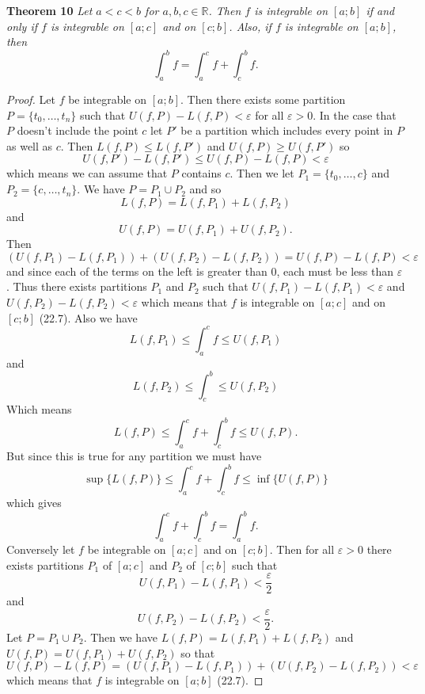 \documentclass{article}
\begin{document}
\begin{flushleft}
\textbf{Theorem 10}
\textsl{Let $a<c<b$ for $a,b,c \in \mathbb{R}$. Then $f$ is integrable on $[a;b]$ if and only if $f$ is integrable on $[a;c]$ and on $[c;b]$. Also, if $f$ is integrable on $[a;b]$, then
\[
\int_a^b f = \int_a^c f + \int_c^b f.
\]}
\begin{proof}
Let $f$ be integrable on $[a;b]$. Then there exists some partition $P = \{t_0, \dots , t_n\}$ such that $U(f,P)-L(f,P) < \varepsilon$ for all $\varepsilon > 0$. In the case that $P$ doesn't include the point $c$ let $P'$ be a partition which includes every point in $P$ as well as $c$. Then $L(f,P) \leq L(f,P')$ and $U(f,P) \geq U(f,P')$ so
\[
U(f,P')-L(f,P') \leq U(f,P) - L(f,P) < \varepsilon
\]
which means we can assume that $P$ contains $c$. Then we let $P_1 = \{t_0, \dots , c\}$ and $P_2 = \{c, \dots , t_n\}$. We have $P = P_1 \cup P_2$ and so
\[
L(f,P) = L(f,P_1) + L(f,P_2)
\]
and
\[
U(f,P) = U(f,P_1) + U(f,P_2).
\]
Then
\[
(U(f,P_1)-L(f,P_1)) + (U(f,P_2) - L(f,P_2)) = U(f,P) - L(f,P) < \varepsilon
\]
and since each of the terms on the left is greater than $0$, each must be less than $\varepsilon$. Thus there exists partitions $P_1$ and $P_2$ such that $U(f,P_1)-L(f,P_1) < \varepsilon$ and $U(f,P_2) - L(f,P_2) < \varepsilon$ which means that $f$ is integrable on $[a;c]$ and on $[c;b]$ (22.7). Also we have
\[
L(f,P_1) \leq \int_a^c f \leq U(f,P_1)
\]
and
\[
L(f,P_2) \leq \int_c^b \leq U(f,P_2)
\]
Which means
\[
L(f,P) \leq \int_a^c f + \int_c^b f \leq U(f,P).
\]
But since this is true for any partition we must have
\[
\sup \{L(f,P)\} \leq \int_a^c f + \int_c^b f \leq \inf \{U(f,P)\}
\]
which gives
\[
\int_a^c f + \int_c^b f = \int_a^b f.
\]
Conversely let $f$ be integrable on $[a;c]$ and on $[c;b]$. Then for all $\varepsilon > 0$ there exists partitions $P_1$ of $[a;c]$ and $P_2$ of $[c;b]$ such that
\[
U(f,P_1) - L(f,P_1) < \frac{\varepsilon}{2}
\]
and
\[
U(f,P_2) - L(f,P_2) < \frac{\varepsilon}{2}.
\]
Let $P = P_1 \cup P_2$. Then we have $L(f,P) = L(f,P_1) + L(f,P_2)$ and $U(f,P) = U(f,P_1) + U(f,P_2)$ so that
\[
U(f,P) - L(f,P) = (U(f,P_1) - L(f,P_1)) + (U(f,P_2) - L(f,P_2)) < \varepsilon
\]
which means that $f$ is integrable on $[a;b]$ (22.7).
\end{proof}


\end{flushleft}
\end{document}
